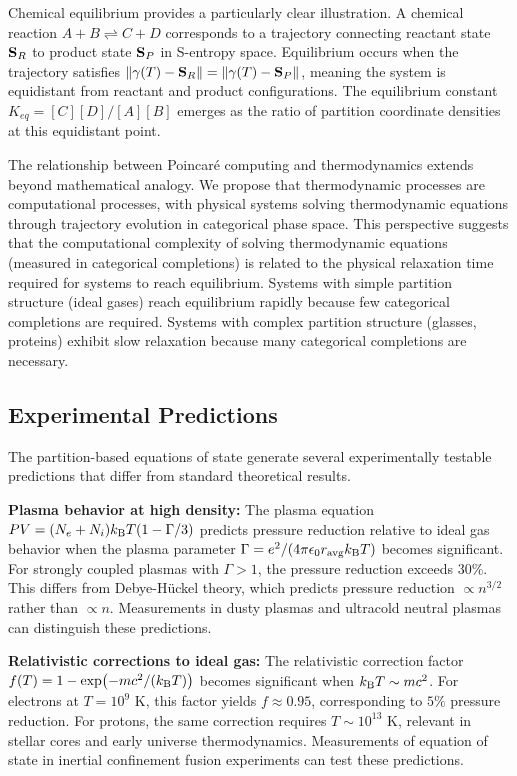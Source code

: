 Chemical equilibrium provides a particularly clear illustration. A chemical reaction $A + B \rightleftharpoons C + D$ corresponds to a trajectory connecting reactant state $\mathbf{S}_R$ to product state $\mathbf{S}_P$ in S-entropy space. Equilibrium occurs when the trajectory satisfies $\|\gamma(T) - \mathbf{S}_R\| = \|\gamma(T) - \mathbf{S}_P\|$, meaning the system is equidistant from reactant and product configurations. The equilibrium constant $K_{eq} = [C][D]/[A][B]$ emerges as the ratio of partition coordinate densities at this equidistant point.

The relationship between Poincaré computing and thermodynamics extends beyond mathematical analogy. We propose that thermodynamic processes are computational processes, with physical systems solving thermodynamic equations through trajectory evolution in categorical phase space. This perspective suggests that the computational complexity of solving thermodynamic equations (measured in categorical completions) is related to the physical relaxation time required for systems to reach equilibrium. Systems with simple partition structure (ideal gases) reach equilibrium rapidly because few categorical completions are required. Systems with complex partition structure (glasses, proteins) exhibit slow relaxation because many categorical completions are necessary.

\subsection{Experimental Predictions}

The partition-based equations of state generate several experimentally testable predictions that differ from standard theoretical results.

\textbf{Plasma behavior at high density:} The plasma equation $PV = (N_e + N_i)k_{\mathrm{B}} T(1 - \Gamma/3)$ predicts pressure reduction relative to ideal gas behavior when the plasma parameter $\Gamma = e^2/(4\pi\epsilon_0 r_{\text{avg}} k_{\mathrm{B}} T)$ becomes significant. For strongly coupled plasmas with $\Gamma > 1$, the pressure reduction exceeds $30\%$. This differs from Debye-Hückel theory, which predicts pressure reduction $\propto n^{3/2}$ rather than $\propto n$. Measurements in dusty plasmas and ultracold neutral plasmas can distinguish these predictions.

\textbf{Relativistic corrections to ideal gas:} The relativistic correction factor $f(T) = 1 - \exp(-mc^2/(k_{\mathrm{B}} T))$ becomes significant when $k_{\mathrm{B}} T \sim mc^2$. For electrons at $T = 10^9$ K, this factor yields $f \approx 0.95$, corresponding to $5\%$ pressure reduction. For protons, the same correction requires $T \sim 10^{13}$ K, relevant in stellar cores and early universe thermodynamics. Measurements of equation of state in inertial confinement fusion experiments can test these predictions.

